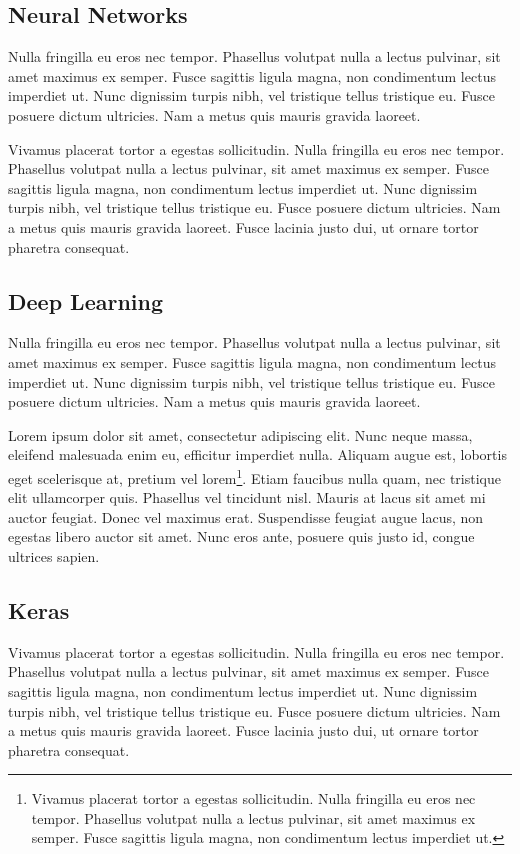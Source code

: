 \subsection{Neural Networks}
Nulla fringilla eu eros nec tempor. Phasellus volutpat nulla a lectus pulvinar, sit amet maximus ex semper. Fusce sagittis ligula magna, non condimentum lectus imperdiet ut. Nunc dignissim turpis nibh, vel tristique tellus tristique eu. Fusce posuere dictum ultricies. Nam a metus quis mauris gravida laoreet.

Vivamus placerat tortor a egestas sollicitudin. Nulla fringilla eu eros nec tempor. Phasellus volutpat nulla a lectus pulvinar, sit amet maximus ex semper. Fusce sagittis ligula magna, non condimentum lectus imperdiet ut. Nunc dignissim turpis nibh, vel tristique tellus tristique eu. Fusce posuere dictum ultricies. Nam a metus quis mauris gravida laoreet. Fusce lacinia justo dui, ut ornare tortor pharetra consequat.

\subsection{Deep Learning}
Nulla fringilla eu eros nec tempor. Phasellus volutpat nulla a lectus pulvinar, sit amet maximus ex semper. Fusce sagittis ligula magna, non condimentum lectus imperdiet ut. Nunc dignissim turpis nibh, vel tristique tellus tristique eu. Fusce posuere dictum ultricies. Nam a metus quis mauris gravida laoreet.

Lorem ipsum dolor sit amet, consectetur adipiscing elit. Nunc neque massa, eleifend malesuada enim eu, efficitur imperdiet nulla. Aliquam augue est, lobortis eget scelerisque at, pretium vel lorem\footnote[2]{Vivamus placerat tortor a egestas sollicitudin. Nulla fringilla eu eros nec tempor. Phasellus volutpat nulla a lectus pulvinar, sit amet maximus ex semper. Fusce sagittis ligula magna, non condimentum lectus imperdiet ut.}. Etiam faucibus nulla quam, nec tristique elit ullamcorper quis. Phasellus vel tincidunt nisl. Mauris at lacus sit amet mi auctor feugiat. Donec vel maximus erat. Suspendisse feugiat augue lacus, non egestas libero auctor sit amet. Nunc eros ante, posuere quis justo id, congue ultrices sapien.


\subsection{Keras}
Vivamus placerat tortor a egestas sollicitudin. Nulla fringilla eu eros nec tempor. Phasellus volutpat nulla a lectus pulvinar, sit amet maximus ex semper. Fusce sagittis ligula magna, non condimentum lectus imperdiet ut. Nunc dignissim turpis nibh, vel tristique tellus tristique eu. Fusce posuere dictum ultricies. Nam a metus quis mauris gravida laoreet. Fusce lacinia justo dui, ut ornare tortor pharetra consequat.



